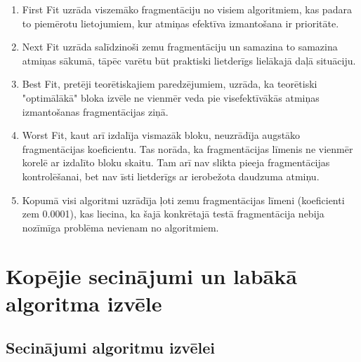 \documentclass{report}
\begin{document}
	\begin{enumerate}
		\item First Fit uzrāda viszemāko fragmentāciju no visiem algoritmiem, kas padara to piemērotu lietojumiem, kur atmiņas efektīva izmantošana ir prioritāte.
	
		\item Next Fit uzrāda salīdzinoši zemu fragmentāciju un samazina to samazina atmiņas sākumā, tāpēc varētu būt praktiski lietderīgs lielākajā daļā situāciju.
		
		\item Best Fit, pretēji teorētiskajiem paredzējumiem, uzrāda, ka teorētiski "optimālākā" bloka izvēle ne vienmēr veda pie visefektīvākās atmiņas izmantošanas fragmentācijas ziņā.
		
		\item Worst Fit, kaut arī izdalīja vismazāk bloku, neuzrādīja augstāko fragmentācijas koeficientu. Tas norāda, ka fragmentācijas līmenis ne vienmēr korelē ar izdalīto bloku skaitu. Tam arī nav slikta pieeja fragmentācijas kontrolēšanai, bet nav īsti lietderīgs ar ierobežota daudzuma atmiņu.
		
		\item Kopumā visi algoritmi uzrādīja ļoti zemu fragmentācijas līmeni (koeficienti zem 0.0001), kas liecina, ka šajā konkrētajā testā fragmentācija nebija nozīmīga problēma nevienam no algoritmiem.
	\end{enumerate}
	
	\section{Kopējie secinājumi un labākā algoritma izvēle}
	
	\subsection{Secinājumi algoritmu izvēlei}
	
\end{document}
